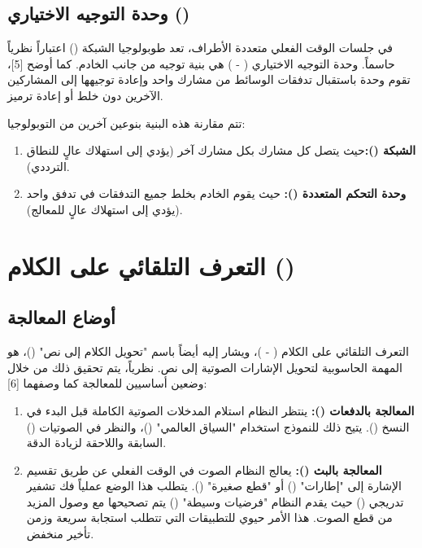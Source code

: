 \subsection{وحدة التوجيه الاختياري ()}

في جلسات الوقت الفعلي متعددة الأطراف، تعد طوبولوجيا الشبكة () اعتباراً نظرياً حاسماً. وحدة التوجيه الاختياري ( - ) هي بنية توجيه من جانب الخادم. كما أوضح [5]، تقوم وحدة  باستقبال تدفقات الوسائط من مشارك واحد وإعادة توجيهها إلى المشاركين الآخرين دون خلط أو إعادة ترميز.

تتم مقارنة هذه البنية بنوعين آخرين من التوبولوجيا:

\begin{enumerate}
  \item \textbf{الشبكة ():}حيث يتصل كل مشارك بكل مشارك آخر (يؤدي إلى استهلاك عالٍ للنطاق الترددي).
  \item \textbf{وحدة التحكم المتعددة ():} حيث يقوم الخادم بخلط جميع التدفقات في تدفق واحد (يؤدي إلى استهلاك عالٍ للمعالج).
\end{enumerate}

\section{التعرف التلقائي على الكلام ()}

\subsection{أوضاع المعالجة }

التعرف التلقائي على الكلام ( - )، ويشار إليه أيضاً باسم "تحويل الكلام إلى نص" ()، هو المهمة الحاسوبية لتحويل الإشارات الصوتية إلى نص. نظرياً، يتم تحقيق ذلك من خلال وضعين أساسيين للمعالجة كما وصفهما [6]:

\begin{enumerate}
  \item \textbf{المعالجة بالدفعات ():} ينتظر النظام استلام المدخلات الصوتية الكاملة قبل البدء في النسخ (). يتيح ذلك للنموذج استخدام "السياق العالمي" ()، والنظر في الصوتيات () السابقة واللاحقة لزيادة الدقة.
  \item \textbf{المعالجة بالبث ():} يعالج النظام الصوت في الوقت الفعلي عن طريق تقسيم الإشارة إلى "إطارات" () أو "قطع صغيرة" (). يتطلب هذا الوضع عملياً فك تشفير تدريجي () حيث يقدم النظام "فرضيات وسيطة" () يتم تصحيحها مع وصول المزيد من قطع الصوت. هذا الأمر حيوي للتطبيقات التي تتطلب استجابة سريعة وزمن تأخير منخفض.
\end{enumerate}

